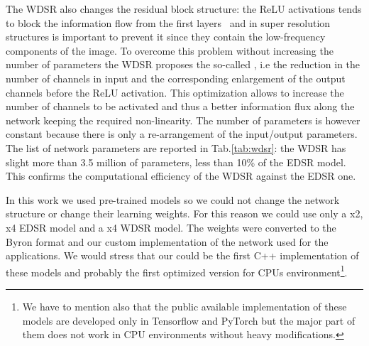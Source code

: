 \documentclass{standalone}
\begin{document}
The WDSR also changes the residual block structure: the ReLU activations tends to block the information flow from the first layers~\cite{mobilenet} and in super resolution structures is important to prevent it since they contain the low-frequency components of the image.
To overcome this problem without increasing the number of parameters the WDSR proposes the so-called , i.e the reduction in the number of channels in input and the corresponding enlargement of the output channels before the ReLU activation.
This optimization allows to increase the number of channels to be activated and thus a better information flux along the network keeping the required non-linearity.
The number of parameters is however constant because there is only a re-arrangement of the input/output parameters.
The list of network parameters are reported in Tab.\ref{tab:wdsr}: the WDSR has slight more than 3.5 million of parameters, less than 10\% of the EDSR model.
This confirms the computational efficiency of the WDSR against the EDSR one.

In this work we used pre-trained models so we could not change the network structure or change their learning weights.
For this reason we could use only a x2, x4 EDSR model and a x4 WDSR model.
The weights were converted to the Byron format and our custom implementation of the network used for the applications.
We would stress that our could be the first \textsf{C++} implementation of these models and probably the first optimized version for CPUs environment\footnote{
  We have to mention also that the public available implementation of these models are developed only in Tensorflow and PyTorch but the major part of them does not work in CPU environments without heavy modifications.
}.
\end{document}
